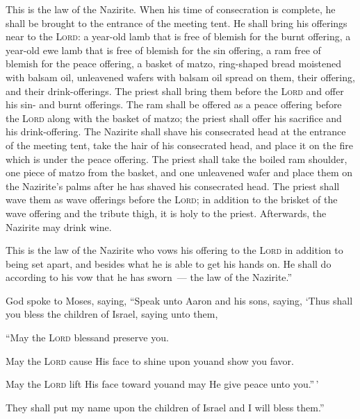 \begin{inparaenum}
   This is the law of the Nazirite. When his time of consecration is complete, he shall be brought to the entrance of the meeting tent.%
   He shall bring his offerings near to the \textsc{Lord}: a year-old lamb that is free of blemish for the burnt offering, a year-old ewe lamb that is free of blemish for the sin offering, a ram free of blemish for the peace offering,%
   a basket of matzo, ring-shaped bread moistened with balsam oil, unleavened wafers with balsam oil spread on them, their offering, and their drink-offerings.%
   The priest shall bring them before the \textsc{Lord} and offer his sin- and burnt offerings.%
   The ram shall be offered as a peace offering before the \textsc{Lord} along with the basket of matzo; the priest shall offer his sacrifice and his drink-offering.%
   The Nazirite shall shave his consecrated head at the entrance of the meeting tent, take the hair of his consecrated head, and place it on the fire which is under the peace offering.%
   The priest shall take the boiled ram shoulder, one piece of matzo from the basket, and one unleavened wafer and place them on the Nazirite's palms after he has shaved his consecrated head.%
   The priest shall wave them as wave offerings before the \textsc{Lord}; in addition to the brisket of the wave offering and the tribute thigh, it is holy to the priest. Afterwards, the Nazirite may drink wine.%
  
   This is the law of the Nazirite who vows his offering to the \textsc{Lord} in addition to being set apart, and besides what he is able to get his hands on. He shall do according to his vow that he has sworn~--- the law of the Nazirite.''%
  
   God spoke to Moses, saying,%
   ``Speak unto Aaron and his sons, saying, `Thus shall you bless the children of Israel, saying unto them,\smallskip%
  
  \pc {} ``May the \textsc{Lord} bless\pa and preserve you.%
  
  \pc {} May the \textsc{Lord} cause His face to shine upon you\pa and show you favor.%
  
  \pc {} May the \textsc{Lord} lift His face toward you\pa and may He give peace unto you.''\,'\smallskip%
  
   They shall put my name upon the children of Israel and I will bless them.''%
\end{inparaenum}
